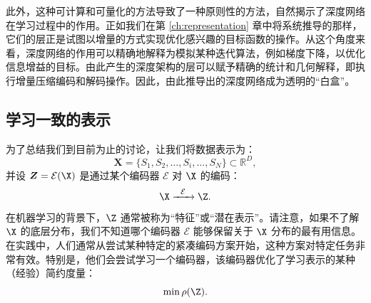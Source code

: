 \documentclass[../../book-main.tex]{subfiles}
\begin{document}
此外，这种可计算和可量化的方法导致了一种原则性的方法，自然揭示了深度网络在学习过程中的作用。正如我们在第 \ref{ch:representation} 章中将系统推导的那样，它们的层正是试图以增量的方式实现优化感兴趣的目标函数的操作。从这个角度来看，深度网络的作用可以精确地解释为模拟某种迭代算法，例如梯度下降，以优化信息增益的目标。由此产生的深度架构的层可以赋予精确的统计和几何解释，即执行增量压缩编码和解码操作。因此，由此推导出的深度网络成为透明的“白盒”。





\subsection{学习一致的表示}

\label{sec:consistency}
为了总结我们到目前为止的讨论，让我们将数据表示为：
\begin{equation}
    \boldsymbol{X} = \{S_1, S_2, \ldots, S_i, \ldots, S_N\} \subset \mathbb{R}^D,
\end{equation}
并设 $\boldsymbol{Z} = \mathcal{E}(\X)$ 是通过某个编码器 $\mathcal{E}$ 对 $\X$ 的编码：
\begin{equation}
    \X  \xrightarrow{\hspace{2mm} \mathcal{E}\hspace{2mm}} \Z.
    \label{eqn:open-loop}
\end{equation}
在机器学习的背景下，$\Z$ 通常被称为“特征”或“潜在表示”。请注意，如果不了解 $\X$ 的底层分布，我们不知道哪个编码器 $\mathcal{E}$ 能够保留关于 $\X$ 分布的最有用信息。在实践中，人们通常从尝试某种特定的紧凑编码方案开始，这种方案对特定任务非常有效。特别是，他们会尝试学习一个编码器，该编码器优化了学习表示的某种（经验）简约度量：
\begin{equation}
    \min \rho(\Z). 
\end{equation}
\end{document}
